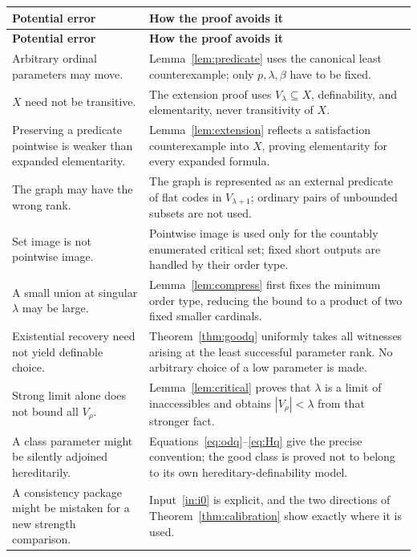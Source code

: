 \documentclass[11pt,letterpaper]{article}
\theoremstyle{definition}
\numberwithin{equation}{section}
\begin{document}
\begingroup\small
\renewcommand{\arraystretch}{1.18}
\begin{longtable}{@{}P{.26\textwidth}P{.68\textwidth}@{}}
\toprule
\textbf{Potential error}&\textbf{How the proof avoids it}\\\midrule\endfirsthead
\toprule\textbf{Potential error}&\textbf{How the proof avoids it}\\\midrule\endhead
Arbitrary ordinal parameters may move.&Lemma~\ref{lem:predicate} uses the canonical least counterexample; only $p,\lambda,\beta$ have to be fixed.\\
$X$ need not be transitive.&The extension proof uses $V_\lambda\subseteq X$, definability, and elementarity, never transitivity of $X$.\\
Preserving a predicate pointwise is weaker than expanded elementarity.&Lemma~\ref{lem:extension} reflects a satisfaction counterexample into $X$, proving elementarity for every expanded formula.\\
The graph may have the wrong rank.&The graph is represented as an external predicate of flat codes in $V_{\lambda+1}$; ordinary pairs of unbounded subsets are not used.\\
Set image is not pointwise image.&Pointwise image is used only for the countably enumerated critical set; fixed short outputs are handled by their order type.\\
A small union at singular $\lambda$ may be large.&Lemma~\ref{lem:compress} first fixes the minimum order type, reducing the bound to a product of two fixed smaller cardinals.\\
Existential recovery need not yield definable choice.&Theorem~\ref{thm:goodq} uniformly takes all witnesses arising at the least successful parameter rank. No arbitrary choice of a low parameter is made.\\
Strong limit alone does not bound all $V_\rho$.&Lemma~\ref{lem:critical} proves that $\lambda$ is a limit of inaccessibles and obtains $|V_\rho|<\lambda$ from that stronger fact.\\
A class parameter might be silently adjoined hereditarily.&Equations~\eqref{eq:odq}--\eqref{eq:Hq} give the precise convention; the good class is proved not to belong to its own hereditary-definability model.\\
A consistency package might be mistaken for a new strength comparison.&Input~\ref{in:i0} is explicit, and the two directions of Theorem~\ref{thm:calibration} show exactly where it is used.\\
\bottomrule
\end{longtable}
\endgroup
\end{document}
